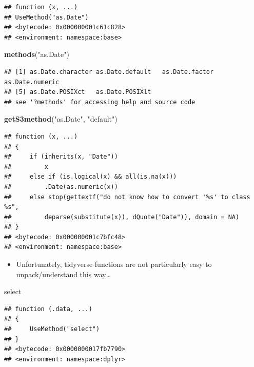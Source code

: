 \documentclass[]{book}
\newenvironment{Shaded}{\begin{snugshade}}{\end{snugshade}}
\newcommand{\KeywordTok}[1]{\textcolor[rgb]{0.13,0.29,0.53}{\textbf{#1}}}
\newcommand{\NormalTok}[1]{#1}
\newcommand{\StringTok}[1]{\textcolor[rgb]{0.31,0.60,0.02}{#1}}
\providecommand{\tightlist}{%
  \setlength{\itemsep}{0pt}\setlength{\parskip}{0pt}}
\theoremstyle{definition}
\theoremstyle{definition}
\theoremstyle{definition}
\theoremstyle{remark}
\begin{document}
\begin{verbatim}
## function (x, ...) 
## UseMethod("as.Date")
## <bytecode: 0x000000001c61c828>
## <environment: namespace:base>
\end{verbatim}

\begin{Shaded}
\begin{Highlighting}[]
\KeywordTok{methods}\NormalTok{(}\StringTok{"as.Date"}\NormalTok{)}
\end{Highlighting}
\end{Shaded}

\begin{verbatim}
## [1] as.Date.character as.Date.default   as.Date.factor    as.Date.numeric  
## [5] as.Date.POSIXct   as.Date.POSIXlt  
## see '?methods' for accessing help and source code
\end{verbatim}

\begin{Shaded}
\begin{Highlighting}[]
\KeywordTok{getS3method}\NormalTok{(}\StringTok{"as.Date"}\NormalTok{, }\StringTok{"default"}\NormalTok{)}
\end{Highlighting}
\end{Shaded}

\begin{verbatim}
## function (x, ...) 
## {
##     if (inherits(x, "Date")) 
##         x
##     else if (is.logical(x) && all(is.na(x))) 
##         .Date(as.numeric(x))
##     else stop(gettextf("do not know how to convert '%s' to class %s", 
##         deparse(substitute(x)), dQuote("Date")), domain = NA)
## }
## <bytecode: 0x000000001c7bfc48>
## <environment: namespace:base>
\end{verbatim}

\begin{itemize}
\tightlist
\item
  Unfortunately, tidyverse functions are not particularly easy to
  unpack/understand this way\ldots{}
\end{itemize}

\begin{Shaded}
\begin{Highlighting}[]
\NormalTok{select}
\end{Highlighting}
\end{Shaded}

\begin{verbatim}
## function (.data, ...) 
## {
##     UseMethod("select")
## }
## <bytecode: 0x0000000017fb7790>
## <environment: namespace:dplyr>
\end{verbatim}
\end{document}
